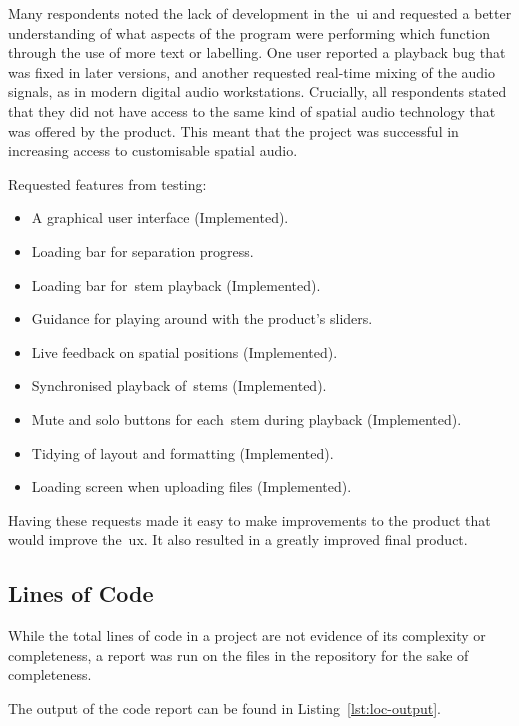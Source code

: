 Many respondents noted
the lack of development in the~\gls{ui} and requested a better understanding
of what aspects of the program were performing which function through the use of more text or labelling.
One user reported a playback bug that was fixed in later versions,
and another requested real-time mixing of the audio signals, as in modern digital audio workstations.
Crucially,
all respondents stated
that they did not have access to the same kind of spatial audio technology that was offered by the product.
This meant that the project was successful in increasing access to customisable spatial audio.

Requested features from testing:

\begin{itemize}
    \item A graphical user interface (Implemented).
    \item Loading bar for separation progress.
    \item Loading bar for~\gls{stem} playback (Implemented).
    \item Guidance for playing around with the product's sliders.
    \item Live feedback on spatial positions (Implemented).
    \item Synchronised playback of~\glspl{stem} (Implemented).
    \item Mute and solo buttons for each~\gls{stem} during playback (Implemented).
    \item Tidying of layout and formatting (Implemented).
    \item Loading screen when uploading files (Implemented).
\end{itemize}

Having these requests made it easy to make improvements to the product that would improve the~\gls{ux}.
It also resulted in a greatly improved final product.

\subsection{Lines of Code}\label{subsec:lines-of-code}

While the total lines of code in a project are not evidence of its complexity or completeness,
a report was run on the files in the repository for the sake of completeness.

The output of the code report can be found in Listing~\ref{lst:loc-output}.

